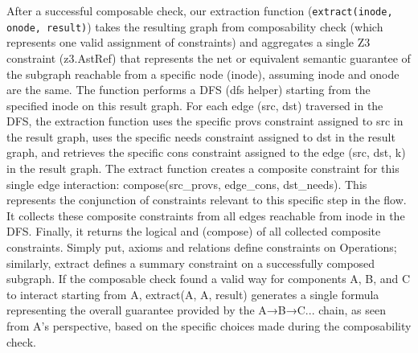 After a successful composable check, our extraction function
(\texttt{extract(inode, onode, result)}) takes the resulting graph
from composability check (which represents one valid assignment of
constraints) and aggregates a single Z3 constraint (z3.AstRef) that
represents the net or equivalent semantic guarantee of the subgraph
reachable from a specific node (inode), assuming inode and onode are
the same. The function performs a DFS (dfs helper) starting from the
specified inode on this result graph. For each edge (src, dst)
traversed in the DFS, the extraction function uses the specific provs
constraint assigned to src in the result graph, uses the specific
needs constraint assigned to dst in the result graph, and retrieves
the specific cons constraint assigned to the edge (src, dst, k) in
the result graph. The extract function creates a composite constraint
for this single edge interaction: compose(src\_provs, edge\_cons,
dst\_needs). This represents the conjunction of constraints relevant
to this specific step in the flow. It collects these composite
constraints from all edges reachable from inode in the DFS. Finally,
it returns the logical and (compose) of all collected composite
constraints. Simply put, axioms and relations define constraints on
Operations; similarly, extract defines a summary constraint on a
successfully composed subgraph. If the composable check found a valid
way for components A, B, and C to interact starting from A,
extract(A, A, result) generates a single formula representing the
overall guarantee provided by the A→B→C... chain, as seen from A's
perspective, based on the specific choices made during the composability check.


